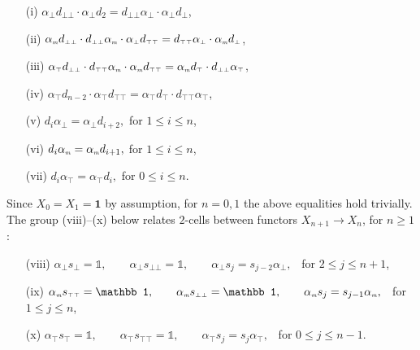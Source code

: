 \documentclass[12pt,leqno]{amsart}
\theoremstyle{definition}
\def\id{{\mathbb 1}}
\def\dtop{d_{\scriptscriptstyle\top}}
\def\atop{\alpha_{\scriptscriptstyle\top}}
\def\abot{\alpha_{\scriptscriptstyle\bot}}
\def\amix{\alpha_{\scriptscriptstyle{\it{m}}}}
\def\dttop{d_{\scriptscriptstyle{\top\top}}}
\def\sttop{s_{\scriptscriptstyle{\top\top}}}
\def\stop{s_{\scriptscriptstyle\top}}
\def\dttop{d_{\scriptscriptstyle{\top\top}}}
\def\dbot{d_{\scriptscriptstyle\bot}}
\def\dbbot{d_{\scriptscriptstyle\bot\bot}}
\def\sbot{s_{\scriptscriptstyle\bot}}
\def\sbbot{s_{\scriptscriptstyle\bot\bot}}
\newcommand{\4}{\texttt{4}}
\newcommand{\jed}{\mathbf{1}}
\begin{document}
\noindent\begin{minipage}{.5\textwidth}
        \begin{enumerate}\label{10 coherence conditions}
    \item[(i)] $\abot\dbbot\cdot \abot d_2=\dbbot\abot\cdot \abot\dbot$, 
    \item[(ii)] $\amix\dbbot\cdot \dbbot\amix \cdot \abot\dttop=\dttop\abot\cdot \amix\dbot$, 
    \item[(iii)] $\atop\dbbot\cdot \dttop\amix \cdot \amix\dttop=\amix\dtop\cdot \dbbot\atop$, 
     \item[(iv)] $\atop d_{n-2}\cdot\atop\dttop=\atop\dtop\cdot \dttop\atop$, 
     \end{enumerate}
    \end{minipage}%
    \begin{minipage}{0.5\textwidth}
      \begin{enumerate}
    \item[(v)] $d_i\abot=\abot d_{i+2},$ for $1\leq i \leq n$, 
    \item[(vi)] $d_i\amix = \amix d_{i+1},$ for $1 \leq i \leq n$, 
    \item[(vii)] $d_i\atop=\atop d_i,$ for $0\leq i \leq n$. 
    \end{enumerate}    
    \end{minipage}
    
\noindent Since $X_0=X_1=\jed$ by assumption, for
$n=0,1$ the above equalities
hold trivially. 
The group (viii)--(x) below relates 
$2$-cells between functors $X_{n+1}\to X_{n}$, for $n\geq 1$: 
\begin{enumerate}
\item[(viii)] 
$\abot\sbot=\id,\qquad \abot\sbbot=\id,\qquad \abot s_j=s_{j-2}\abot,$ 
\ for $2\leq j\leq n+1$, 
    \item[(ix)] $\amix\sttop = \id,\qquad \amix\sbbot=\id,\qquad \amix s_j=s_{j-1}\amix,$ \ for $1\leq j \leq n$,
    \item[(x)] 
$\atop\stop=\id,\qquad \atop\sttop=\id,\qquad \atop s_j= s_{j}\atop,$
\ for $0\leq j\leq n-1$.
\end{enumerate}
 
\end{document}
